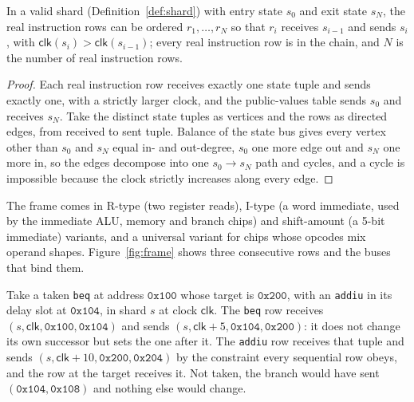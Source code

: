 \begin{lemma}
\label{lem:chain}
In a valid shard (Definition~\ref{def:shard}) with entry state $s_0$ and exit state $s_N$, the real instruction rows can be ordered $r_1, \dots, r_N$ so that $r_i$ receives $s_{i-1}$ and sends $s_i$, with $\mathsf{clk}(s_i) > \mathsf{clk}(s_{i-1})$; every real instruction row is in the chain, and $N$ is the number of real instruction rows.
\end{lemma}
\begin{proof}
Each real instruction row receives exactly one state tuple and sends exactly one, with a strictly larger clock, and the public-values table sends $s_0$ and receives $s_N$. Take the distinct state tuples as vertices and the rows as directed edges, from received to sent tuple. Balance of the state bus gives every vertex other than $s_0$ and $s_N$ equal in- and out-degree, $s_0$ one more edge out and $s_N$ one more in, so the edges decompose into one $s_0 \to s_N$ path and cycles, and a cycle is impossible because the clock strictly increases along every edge.
\end{proof}

The frame comes in R-type (two register reads), I-type (a word immediate, used by the immediate ALU, memory and branch chips) and shift-amount (a 5-bit immediate) variants, and a universal variant for chips whose opcodes mix operand shapes. Figure~\ref{fig:frame} shows three consecutive rows and the buses that bind them.

\begin{example}
\label{ex:delay}
Take a taken \texttt{beq} at address $\mathtt{0x100}$ whose target is $\mathtt{0x200}$, with an \texttt{addiu} in its delay slot at $\mathtt{0x104}$, in shard $s$ at clock $\mathsf{clk}$. The \texttt{beq} row receives $(s, \mathsf{clk}, \mathtt{0x100}, \mathtt{0x104})$ and sends $(s, \mathsf{clk}+5, \mathtt{0x104}, \mathtt{0x200})$: it does not change its own successor but sets the one after it. The \texttt{addiu} row receives that tuple and sends $(s, \mathsf{clk}+10, \mathtt{0x200}, \mathtt{0x204})$ by the constraint every sequential row obeys, and the row at the target receives it. Not taken, the branch would have sent $(\mathtt{0x104}, \mathtt{0x108})$ and nothing else would change.
\end{example}

